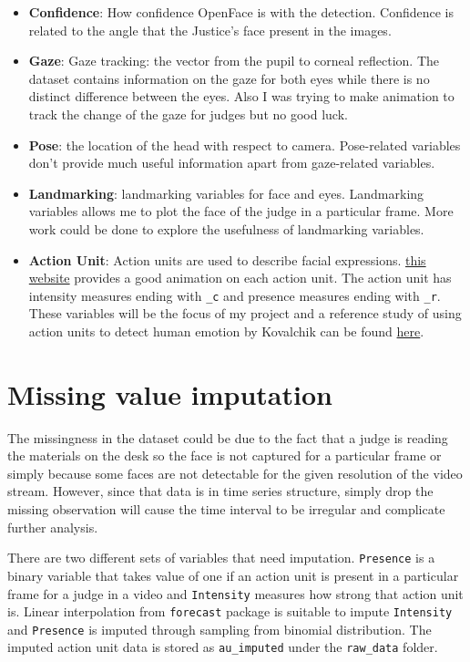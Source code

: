 \documentclass{monashthesis}
\begin{document}
\begin{itemize}
\item
  \textbf{Confidence}: How confidence OpenFace is with the detection. Confidence is related to the angle that the Justice's face present in the images.
\item
  \textbf{Gaze}: Gaze tracking: the vector from the pupil to corneal reflection. The dataset contains information on the gaze for both eyes while there is no distinct difference between the eyes. Also I was trying to make animation to track the change of the gaze for judges but no good luck.
\item
  \textbf{Pose}: the location of the head with respect to camera. Pose-related variables don't provide much useful information apart from gaze-related variables.
\item
  \textbf{Landmarking}: landmarking variables for face and eyes. Landmarking variables allows me to plot the face of the judge in a particular frame. More work could be done to explore the usefulness of landmarking variables.
\item
  \textbf{Action Unit}: Action units are used to describe facial expressions. \href{https://imotions.com/blog/facial-action-coding-system/}{this website} provides a good animation on each action unit. The action unit has intensity measures ending with \texttt{\_c} and presence measures ending with \texttt{\_r}. These variables will be the focus of my project and a reference study of using action units to detect human emotion by Kovalchik can be found \href{http://www.sloansportsconference.com/wp-content/uploads/2018/02/2005.pdf}{here}.
\end{itemize}

\hypertarget{missing-value-imputation}{%
\section{Missing value imputation}\label{missing-value-imputation}}

The missingness in the dataset could be due to the fact that a judge is reading the materials on the desk so the face is not captured for a particular frame or simply because some faces are not detectable for the given resolution of the video stream. However, since that data is in time series structure, simply drop the missing observation will cause the time interval to be irregular and complicate further analysis.

There are two different sets of variables that need imputation. \texttt{Presence} is a binary variable that takes value of one if an action unit is present in a particular frame for a judge in a video and \texttt{Intensity} measures how strong that action unit is. Linear interpolation from \texttt{forecast} package is suitable to impute \texttt{Intensity} and \texttt{Presence} is imputed through sampling from binomial distribution. The imputed action unit data is stored as \texttt{au\_imputed} under the \texttt{raw\_data} folder.
\end{document}

